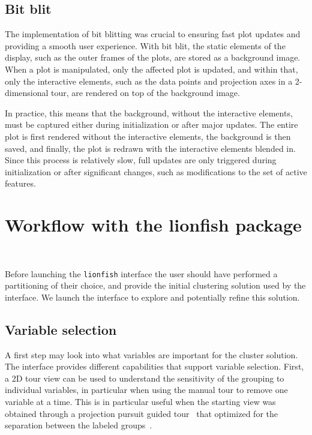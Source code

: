 \documentclass[article]{ajs}
\begin{document}
\subsection{Bit blit}

The implementation of bit blitting was crucial to ensuring fast plot updates and providing a smooth user experience. With bit blit, the static elements of the display, such as the outer frames of the plots, are stored as a background image. When a plot is manipulated, only the affected plot is updated, and within that, only the interactive elements, such as the data points and projection axes in a 2-dimensional tour, are rendered on top of the background image.

In practice, this means that the background, without the interactive elements, must be captured either during initialization or after major updates. The entire plot is first rendered without the interactive elements, the background is then saved, and finally, the plot is redrawn with the interactive elements blended in. Since this process is relatively slow, full updates are only triggered during initialization or after significant changes, such as modifications to the set of active features.

\section{Workflow with the lionfish package}~\label{workflow}

Before launching the \texttt{lionfish} interface the user should have performed a partitioning of their choice, and provide the initial clustering solution used by the interface. We launch the interface to explore and potentially refine this solution.

\subsection{Variable selection}

A first step may look into what variables are important for the cluster solution. The interface provides different capabilities that support variable selection. First, a 2D tour view can be used to understand the sensitivity of the grouping to individual variables, in particular when using the manual tour to remove one variable at a time. This is in particular useful when the starting view was obtained through a projection pursuit guided tour~\citep{CBCH94} that optimized for the separation between the labeled groups~\citep{lckl2005}.
\end{document}
